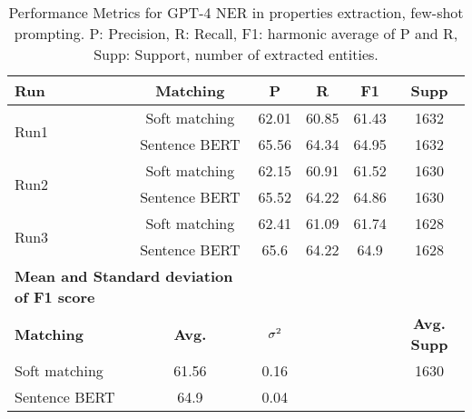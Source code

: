 \begin{table}[htbp]
\small
  \centering
  \caption{Performance Metrics for GPT-4 NER in properties extraction, few-shot prompting. P: Precision, R: Recall, F1: harmonic average of P and R, Supp: Support, number of extracted entities.}
  \begin{tabular}{lccccc}
    \toprule
    \textbf{Run} & \textbf{Matching} & \textbf{P} & \textbf{R} & \textbf{F1} & \textbf{Supp} \\
    \midrule
    \multirow{2}{*}{Run1} & Soft matching & 62.01 & 60.85 & 61.43 & 1632 \\
    & Sentence BERT & 65.56 & 64.34 & 64.95 & 1632 \\
    \midrule    
    \multirow{2}{*}{Run2} & Soft matching & 62.15 & 60.91 & 61.52 & 1630 \\
    & Sentence BERT & 65.52 & 64.22 & 64.86 & 1630 \\
    \midrule    
    \multirow{2}{*}{Run3} & Soft matching & 62.41 & 61.09 & 61.74 & 1628 \\
    & Sentence BERT & 65.6 & 64.22 & 64.9 & 1628 \\
    \midrule    
    \multicolumn{2}{l}{\textbf{Mean and Standard deviation of F1 score}} & & & & \\
    \midrule
    \textbf{Matching} & \textbf{Avg.} & $\sigma\textsuperscript{2}$ & & & \textbf{Avg. Supp}\\
    Soft matching & 61.56 & 0.16 & & & 1630 \\
    Sentence BERT & 64.9 & 0.04 & & & \\
    \bottomrule
  \end{tabular}
\end{table}

